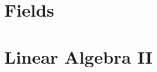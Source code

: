 \documentclass[openany]{book}
\begin{document}


























\chapter{Fields}


\chapter{Linear Algebra II}
\end{document}
